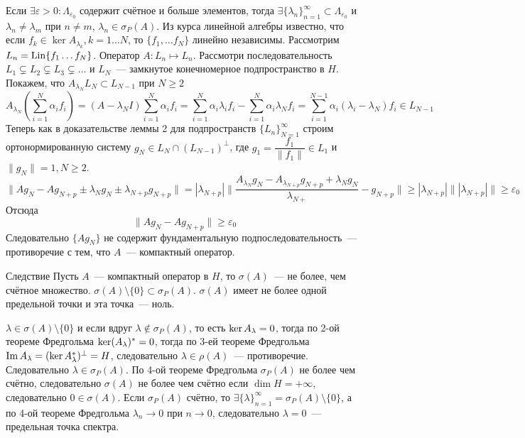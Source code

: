 \documentclass[14pt]{extarticle}
\begin{document}
\begin{Proof}
    Если $\exists \varepsilon > 0\colon \Lambda_{\varepsilon_0}$ содержит 
    счётное и больше элементов, тогда $\exists \{\lambda_n\}_{n = 1}^\infty
    \subset \Lambda_{\varepsilon_0}$ и $\lambda_n \ne \lambda_m$ при
    $n \ne m$, $\lambda_n \in \sigma_P(A)$.
    Из курса линейной алгебры известно, что если $f_k \in \ker A_{\lambda_k},
    k=1\dots N$, то $\{f_1,\dots f_N\}$ линейно независимы.
    Рассмотрим $L_n = \operatorname{Lin}\{f_1 \dots f_N\}$.
    Оператор $A : L_n \mapsto L_n$.
    Рассмотри последовательность $L_1 \varsubsetneq L_2 \varsubsetneq L_3
    \varsubsetneq \dots$ и $L_N$~--- замкнутое конечномерное подпространство
    в $H$.
    Покажем, что $A_{\lambda_N}L_N \subset L_{N - 1}$ при $N \ge 2$
    $$
    A_{\lambda_N} (\sum\limits_{i = 1}^N \alpha_i f_i) = (A - \lambda_N I)
    \sum\limits_{i = 1}^N \alpha_i f_i = \sum\limits_{i = 1}^N
    \alpha_i \lambda_i f_i - \sum\limits_{i = 1}^N \alpha_i \lambda_N f_i =
    \sum\limits_{i = 1}^{N - 1} \alpha_i (\lambda_i - \lambda_N) f_i \in 
    L_{N - 1}
    $$
    Теперь как в доказательстве леммы 2 для подпространств $\{L_n\}_{N = 1}^
    \infty$ строим ортонормированную систему $g_N \in L_N \cap (L_{N - 1})^
    \perp$, где $g_1 = \dfrac{f_1}{\|f_1\|} \in L_1$ и $\|g_N\| = 1, N \ge 2$.
    $$
    \|A g_N - A g_{N + p} \pm \lambda_N g_N \pm \lambda_{N + p} g_{N + p}\| =
    |\lambda_{N + p}|\|\dfrac{A_{\lambda_N}g_N - A_{\lambda_{N + p}}g_{N + p} +
    \lambda_N g_N}{\lambda_{N +}} - g_{N + p}\| \ge |\lambda_{N + p}|\||
    \lambda_{N + p}|\| \ge \varepsilon_0
    $$
    Отсюда
    $$
    \|A g_N - A g_{N + p}\| \ge \varepsilon_0
    $$
    Следовательно $\{A g_N\}$ не содержит фундаментальную 
    подпоследовательность~--- противоречие с тем, что $A$~--- компактный
    оператор.
\end{Proof}
\begin{MathCl}{Следствие}
    Пусть $A$~--- компактный оператор в $H$, то $\sigma(A)$~--- не более, 
    чем счётное множество.
    $\sigma(A) \setminus \{0\} \subset \sigma_P(A)$.
    $\sigma(A)$ имеет не более одной предельной точки и эта точка~--- ноль.
\end{MathCl}
\begin{Proof}
    $\lambda \in \sigma(A)\setminus\{0\}$ и если вдруг $\lambda \notin
    \sigma_P(A)$, то есть $\ker \Al = 0$, тогда по 2-ой теореме Фредгольма
    $\ker(\Al)^* = 0$, тогда по 3-ей теореме Фредгольма $\Im \Al = (\ker
    \Al^*)^\perp = H$, следовательно $\lambda \in \rho(A)$~--- противоречие.
    Следовательно $\lambda \in \sigma_P(A)$.
    По 4-ой теореме Фредгольма $\sigma_P(A)$ не более чем счётно,
    следовательно $\sigma(A)$ не более чем счётно если $\dim H = +\infty$,
    следовательно $0 \in \sigma(A)$.
    Если $\sigma_P(A)$ счётно, то $\exists \{\lambda\}_{n = 1}^\infty = 
    \sigma_P(A) \setminus\{0\}$, а по 4-ой теореме Фредгольма $\lambda_n \to 0
    $ при $n \to 0$, следовательно $\lambda = 0$~--- предельная точка спектра.
\end{Proof}
\end{document}
